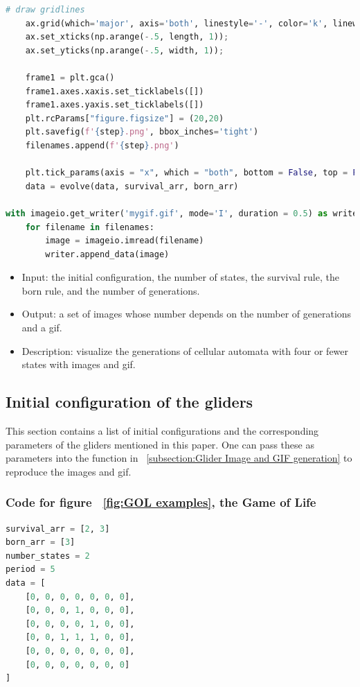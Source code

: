 \documentclass[12pt]{article}
\numberwithin{figure}{section} %
\begin{document}
\begin{lstlisting}[language = Python]
    # draw gridlines
    ax.grid(which='major', axis='both', linestyle='-', color='k', linewidth=2)
    ax.set_xticks(np.arange(-.5, length, 1));
    ax.set_yticks(np.arange(-.5, width, 1));

    frame1 = plt.gca()
    frame1.axes.xaxis.set_ticklabels([])
    frame1.axes.yaxis.set_ticklabels([])
    plt.rcParams["figure.figsize"] = (20,20)
    plt.savefig(f'{step}.png', bbox_inches='tight')
    filenames.append(f'{step}.png')
    
    plt.tick_params(axis = "x", which = "both", bottom = False, top = False)
    data = evolve(data, survival_arr, born_arr)

with imageio.get_writer('mygif.gif', mode='I', duration = 0.5) as writer:
    for filename in filenames:
        image = imageio.imread(filename)
        writer.append_data(image)
\end{lstlisting}
\vspace{-1.5em}
\begin{itemize}[leftmargin = 0.5cm, topsep=0pt,itemsep=-1ex,partopsep=1ex,parsep=1ex]
\item Input: the initial configuration, the number of states, the survival rule, the born rule, and the number of generations. 
\item Output: a set of images whose number depends on the number of generations and a gif. 
\item Description: visualize the generations of cellular automata with four or fewer states with images and gif. 
\end{itemize}

\subsection{Initial configuration of the gliders}
\label{subsection:Initial configuration of the gliders}
This section contains a list of initial configurations and the corresponding parameters of the gliders mentioned in this paper. One can pass these as parameters into the function in ~\ref{subsection:Glider Image and GIF generation} to reproduce the images and gif. 

\subsubsection{Code for figure ~\ref{fig:GOL examples}, the Game of Life}
\label{subsubsection:GOL}
\begin{lstlisting}[language = Python]
survival_arr = [2, 3]
born_arr = [3]
number_states = 2
period = 5
data = [
    [0, 0, 0, 0, 0, 0, 0],
    [0, 0, 0, 1, 0, 0, 0],
    [0, 0, 0, 0, 1, 0, 0],
    [0, 0, 1, 1, 1, 0, 0],
    [0, 0, 0, 0, 0, 0, 0],
    [0, 0, 0, 0, 0, 0, 0]   
]
\end{lstlisting}
\end{document}
